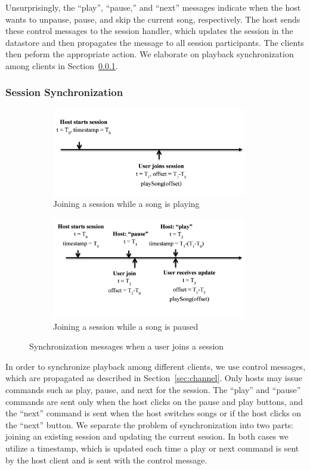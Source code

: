Unsurprisingly, the ``play'', ``pause,'' and ``next'' messages 
indicate when the host wants to unpause, pause, and skip the current song, respectively.
The host sends these control messages to the session handler, which updates
the session in the datastore and then propagates the message to all session
participants. The clients then peform the appropriate action. We elaborate on
playback synchronization among clients in Section~\ref{sec:sync}.

\subsubsection{Session Synchronization}
\label{sec:sync}

\begin{figure}[t!]
	\centering
	\begin{subfigure}[b]{0.5\textwidth}
		\centering
		\includegraphics[width=85mm]{joinSessionPlay.png}
		\caption{Joining a session while a song is playing}
		\label{fig:syncJoinPlay}
	\end{subfigure}
	
	\begin{subfigure}[b]{0.5\textwidth}
		\centering
		\includegraphics[width=85mm]{joinSessionPause.png}
		\caption{Joining a session while a song is paused}
		\label{fig:syncJoinPause}
	\end{subfigure}
	\caption{Synchronization messages when a user joins a session}
	\label{fig:syncJoin}
\end{figure}

In order to synchronize playback among different clients, we use 
control messages, which are propagated as described in Section~\ref{sec:channel}. 
Only hosts may issue commands such as play, pause, and 
next for the session. The ``play'' and ``pause'' commands are sent
only when the host clicks on the pause and play buttons, and the 
``next'' command is sent when the host switches songs or if the
host clicks on the ``next'' button. We separate the problem of synchronization 
into two parts: joining an existing session and updating the
current session. In both cases we utilize a timestamp, which is 
updated each time a play or next command is sent by the host client
and is sent with the control message. 

